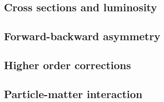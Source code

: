 \subsection{Cross sections and luminosity}
\subsection{Forward-backward asymmetry}
\subsection{Higher order corrections}
\subsection{Particle-matter interaction}
